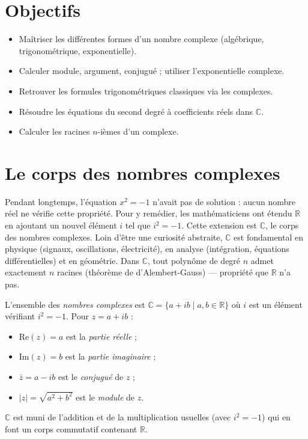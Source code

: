 \documentclass[11pt,a4paper,twoside]{book}
\newcommand{\R}{\mathbb{R}}
\newcommand{\C}{\mathbb{C}}
\begin{document}
\section*{Objectifs}
\begin{itemize}[leftmargin=1.5em]
  \item Maîtriser les différentes formes d'un nombre complexe (algébrique, trigonométrique, exponentielle).
  \item Calculer module, argument, conjugué ; utiliser l'exponentielle complexe.
  \item Retrouver les formules trigonométriques classiques via les complexes.
  \item Résoudre les équations du second degré à coefficients réels dans $\C$.
  \item Calculer les racines $n$-ièmes d'un complexe.
\end{itemize}

\section{Le corps des nombres complexes}

Pendant longtemps, l'équation $x^2 = -1$ n'avait pas de solution : aucun nombre réel ne vérifie cette propriété. Pour y remédier, les mathématiciens ont étendu $\R$ en ajoutant un nouvel élément $i$ tel que $i^2 = -1$. Cette extension est $\C$, le corps des nombres complexes. Loin d'être une curiosité abstraite, $\C$ est fondamental en physique (signaux, oscillations, électricité), en analyse (intégration, équations différentielles) et en géométrie. Dans $\C$, tout polynôme de degré $n$ admet exactement $n$ racines (théorème de d'Alembert-Gauss) — propriété que $\R$ n'a pas.

\begin{definitionbox}[Corps $\C$]
L'ensemble des \emph{nombres complexes} est $\C = \{a + ib \mid a, b \in \R\}$
où $i$ est un élément vérifiant $i^2 = -1$.
Pour $z = a + ib$ :
\begin{itemize}
  \item $\mathrm{Re}(z) = a$ est la \emph{partie réelle} ;
  \item $\mathrm{Im}(z) = b$ est la \emph{partie imaginaire} ;
  \item $\bar{z} = a - ib$ est le \emph{conjugué} de $z$ ;
  \item $|z| = \sqrt{a^2 + b^2}$ est le \emph{module} de $z$.
\end{itemize}
$\C$ est muni de l'addition et de la multiplication usuelles (avec $i^2=-1$) qui en font un corps commutatif contenant $\R$.
\end{definitionbox}
\end{document}
